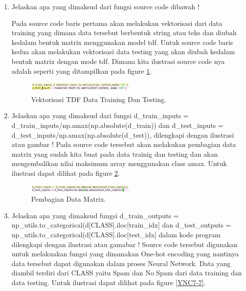 \begin{enumerate}
\item Jelaskan apa yang dimaksud dari fungsi source code dibawah !
	
	\subitem Pada source code baris pertama akan melakukan vektorisasi dari data training yang dimana data tersebut berbentuk string atau teks dan diubah kedalam bentuk matrix menggunakan model tdf. Untuk source code baris kedua akan melakukan vektorisasi data testing yang akan diubah kedalam bentuk matrix dengan mode tdf. Dimana kita ilustrasi source code nya adalah seperti yang ditampilkan pada figure \ref{YNC7-5}.

	\begin{figure}[!htbp!]
		\centerline{\includegraphics[width=0.5\textwidth]{figures/YN/Chapter7/YNC7-5.png}}
		\caption{Vektorisasi TDF Data Training Dan Testing.}
		\label{YNC7-5}
	\end{figure}

\item Jelaskan apa yang dimaksud dari fungsi d\_train\_inputs = d\_train\_inputs/np.amax(np.absolute(d\_train)) dan  d\_test\_inputs = d\_test\_inputs/np.amax(np.absolute(d\_test)), dilengkapi dengan ilustrasi atau gambar !
	\subitem Pada source code tersebut akan melakukan pembagian data matrix yang sudah kita buat pada data trainig dan testing dan akan mengembalikan nilai maksimum array menggunakan class amax. Untuk ilustrasi dapat dilihat pada figure \ref{YNC7-6}.

	\begin{figure}[!htbp!]
		\centerline{\includegraphics[width=0.5\textwidth]{figures/YN/Chapter7/YNC7-6.png}}
		\caption{Pembagian Data Matrix.}
		\label{YNC7-6}
	\end{figure}

\item Jelaskan apa yang dimaksud fungsi d\_train\_outputs = np\_utils.to\_categorical(d[CLASS].iloc[train\_idx] dan  d\_test\_outputs = np\_utils.to\_categorical(d[CLASS].iloc[test\_idx] dalam kode program dilengkapi dengan ilustrasi atau gamabar !
	\subitem Source code tersebut digunakan untuk melakuakan fungsi yang dinamakan One-hot encoding yang nantinya data tersebut dapat digunakan dalam proses Neural Network. Data yang diambil terdiri dari CLASS yaitu Spam dan No Spam dari data training dan data testing. Untuk ilustrasi dapat dilihat pada figure \ref{YNC7-7}.


\end{enumerate}
